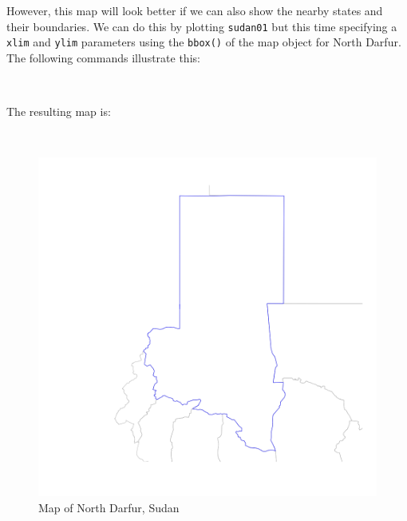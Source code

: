 \documentclass[12pt,a4paper,a4paper]{book}
\newenvironment{Shaded}{\begin{snugshade}}{\end{snugshade}}
\newcommand{\KeywordTok}[1]{\textcolor[rgb]{0.13,0.29,0.53}{\textbf{#1}}}
\newcommand{\DataTypeTok}[1]{\textcolor[rgb]{0.13,0.29,0.53}{#1}}
\newcommand{\DecValTok}[1]{\textcolor[rgb]{0.00,0.00,0.81}{#1}}
\newcommand{\StringTok}[1]{\textcolor[rgb]{0.31,0.60,0.02}{#1}}
\newcommand{\OtherTok}[1]{\textcolor[rgb]{0.56,0.35,0.01}{#1}}
\newcommand{\OperatorTok}[1]{\textcolor[rgb]{0.81,0.36,0.00}{\textbf{#1}}}
\newcommand{\NormalTok}[1]{#1}
\theoremstyle{definition}
\theoremstyle{definition}
\theoremstyle{definition}
\theoremstyle{remark}
\begin{document}
\newpage

However, this map will look better if we can also show the nearby states
and their boundaries. We can do this by plotting \texttt{sudan01} but
this time specifying a \texttt{xlim} and \texttt{ylim} parameters using
the \texttt{bbox()} of the map object for North Darfur. The following
commands illustrate this:

~

\begin{Shaded}
\end{Shaded}

\newpage

The resulting map is:

~

\begin{figure}[H]

{\centering \includegraphics{figures/map13-1} 

}

\caption{Map of North Darfur, Sudan}\label{fig:map13}
\end{figure}
\end{document}
